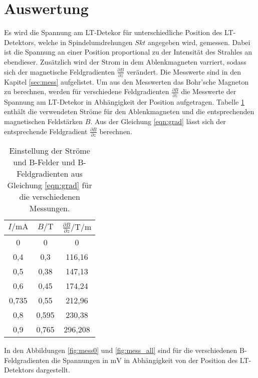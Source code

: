 \newpage
\section{Auswertung}
\label{sec:Auswertung}
Es wird die Spannung am LT-Detekor für unterschiedliche Position des LT-Detektors, welche in Spindelumdrehungen $Skt$ angegeben wird, gemessen.
Dabei ist die Spannung an einer Position proportional zu der Intensität des Strahles an ebendieser.
Zusätzlich wird der Strom in dem Ablenkmagneten varriert, sodass sich der
magnetische Feldgradienten $\frac{\partial B}{\partial z}$
verändert. Die Messwerte sind in den Kapitel \ref{sec:mess} aufgelistet.
Um aus den Messwerten das Bohr'sche Magneton zu berechnen,
werden für verschiedene Feldgradienten $\frac{\partial B}{\partial z}$ die
Messwerte der Spannung am LT-Detekor in Abhängigkeit der Position aufgetragen.
Tabelle \ref{tab:strom} enthält die verwendeten Ströme für den
Ablenkmagneten und die entsprechenden magnetischen Feldstärken $B$. Aus der
Gleichung \eqref{eqn:grad}
lässt sich der entsprechende Feldgradient $\frac{\partial B}{\partial z}$ berechnen.
\begin{table}
\centering
\caption{Einstellung der Ströme und B-Felder und B-Feldgradienten aus Gleichung \eqref{eqn:grad} für die verschiedenen Messungen.}
\label{tab:strom}
\begin{tabular}{c c c}
\toprule
 $I/\si{\milli\ampere}$ & $B/\si{\tesla}$ & $\frac{\partial B}{\partial z}/\si{\tesla\per\meter}$\\
\midrule
0     &  0     &  0        \\
0,4   & 0,3    & 116,16    \\
0,5   & 0,38   & 147,13    \\
0,6   & 0,45   & 174,24    \\
0,735 & 0,55   & 212,96    \\
0,8   & 0,595  & 230,38    \\
0,9   & 0,765  & 296,208   \\
\bottomrule
\end{tabular}
\end{table}

In den Abbildungen \ref{fig:mess0} und \ref{fig:mess_all}
sind für die verschiedenen B-Feldgradienten
die Spannungen in $\si{\milli\volt}$ in Abhängigkeit von der Position des LT-Detektors dargestellt.

